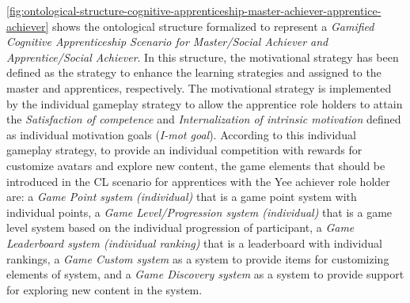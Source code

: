 \autoref{fig:ontological-structure-cognitive-apprenticeship-master-achiever-apprentice-achiever} shows the ontological structure formalized to represent a \emph{Gamified Cognitive Apprenticeship Scenario for Master/Social Achiever and Apprentice/Social Achiever}. In this structure, the motivational strategy  has been defined as the strategy to enhance the learning strategies  and  assigned to the master and apprentices, respectively. The motivational strategy  is implemented by the individual gameplay strategy  to allow the apprentice role holders to attain the \emph{Satisfaction of competence} and \emph{Internalization of intrinsic motivation} defined as individual motivation goals (\emph{I-mot goal}). According to this individual gameplay strategy, to provide an individual competition with rewards for customize avatars and explore new content, the game elements that should be introduced in the CL scenario for apprentices with the Yee achiever role holder are: a \emph{Game Point system (individual)} that is a game point system with individual points, a \emph{Game Level/Progression system (individual)} that is a game level system based on the individual progression of participant, a \emph{Game Leaderboard system (individual ranking)} that is a leaderboard with individual rankings, a \emph{Game Custom system} as a system to provide items for customizing elements of system, and a \emph{Game Discovery system} as a system to provide support for exploring new content in the system.

